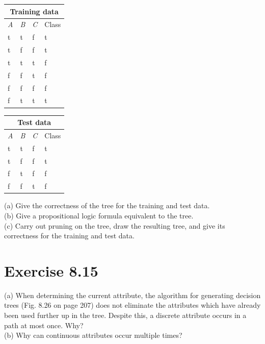 \documentclass[10pt]{book}
\begin{document}
\begin{center}
\begin{tabular}{llll}
\multicolumn{4}{c}{Training data} \\
\hline
\textit{A} & \textit{B} & \textit{C} & Class \\
\hline
t & t & f & t \\
\hline
t & f & f & t \\
\hline
t & t & t & f \\
\hline
f & f & t & f \\
\hline
f & f & f & f \\
\hline
f & t & t & t \\
\hline
\end{tabular}
\end{center}

\begin{center}
\begin{tabular}{llll}
\multicolumn{4}{c}{Test data} \\
\hline
\textit{A} & \textit{B} & \textit{C} & Class \\
\hline
t & t & f & t \\
\hline
t & f & f & t \\
\hline
f & t & f & f \\
\hline
f & f & t & f \\
\hline
\end{tabular}
\end{center}

(a) Give the correctness of the tree for the training and test data.\\
(b) Give a propositional logic formula equivalent to the tree.\\
(c) Carry out pruning on the tree, draw the resulting tree, and give its correctness for the training and test data.

\section{Exercise 8.15}
(a) When determining the current attribute, the algorithm for generating decision trees (Fig. 8.26 on page 207) does not eliminate the attributes which have already been used further up in the tree. Despite this, a discrete attribute occurs in a path at most once. Why?\\
(b) Why can continuous attributes occur multiple times?
\end{document}
